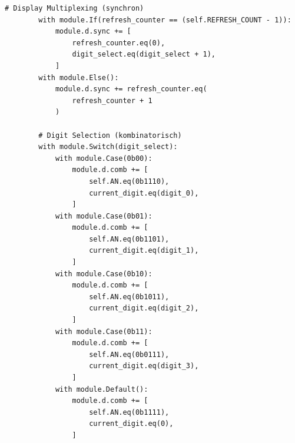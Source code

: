 ﻿\documentclass[12pt,a4paper]{report}
\begin{document}
\begin{lstlisting}[style=pythonstyle, caption={Amaranth ALU-Implementation - Teil 5: Display Multiplexing}]
        # Display Multiplexing (synchron)
        with module.If(refresh_counter == (self.REFRESH_COUNT - 1)):
            module.d.sync += [
                refresh_counter.eq(0),
                digit_select.eq(digit_select + 1),
            ]
        with module.Else():
            module.d.sync += refresh_counter.eq(
                refresh_counter + 1
            )
        
        # Digit Selection (kombinatorisch)
        with module.Switch(digit_select):
            with module.Case(0b00):
                module.d.comb += [
                    self.AN.eq(0b1110),
                    current_digit.eq(digit_0),
                ]
            with module.Case(0b01):
                module.d.comb += [
                    self.AN.eq(0b1101),
                    current_digit.eq(digit_1),
                ]
            with module.Case(0b10):
                module.d.comb += [
                    self.AN.eq(0b1011),
                    current_digit.eq(digit_2),
                ]
            with module.Case(0b11):
                module.d.comb += [
                    self.AN.eq(0b0111),
                    current_digit.eq(digit_3),
                ]
            with module.Default():
                module.d.comb += [
                    self.AN.eq(0b1111),
                    current_digit.eq(0),
                ]
\end{lstlisting}
\end{document}

